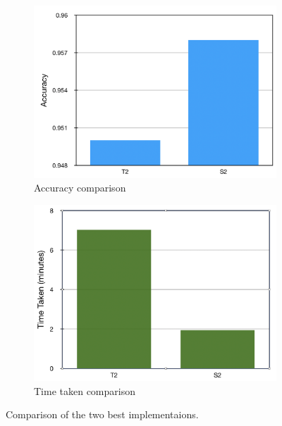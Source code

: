 \begin{figure}[h]
  \centering
  \begin{subfigure}[b]{0.48\linewidth}
  \includegraphics[width=\linewidth]{figs/acc.png}
  \caption{Accuracy comparison}
  \label{fig:con_loss}
  \end{subfigure}
  \hfill
   \begin{subfigure}[b]{0.48\linewidth}
   \includegraphics[width=\linewidth]{figs/time.png}
   \caption{Time taken comparison}
   \label{fig:tri_loss}
  \end{subfigure}
    \hfill
    \caption{Comparison of the two best implementaions.}
    \label{fig:siatrainloss}
\end{figure}




